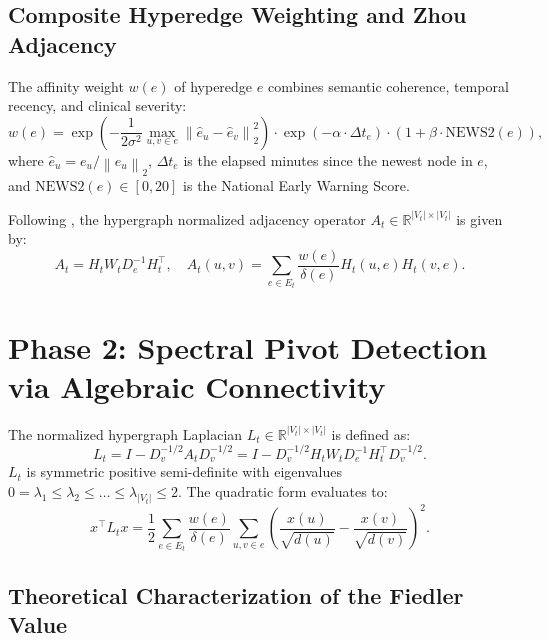 \documentclass[ijds,dblanonrev]{informs4}
\newcommand{\R}{\mathbb{R}}
\newcommand{\norm}[1]{\left\lVert#1\right\rVert}
\begin{document}
\subsection{Composite Hyperedge Weighting and Zhou Adjacency}
The affinity weight $w(e)$ of hyperedge $e$ combines semantic coherence, temporal recency, and clinical severity:
\begin{equation}
  w(e) = \exp\left( -\frac{1}{2\sigma^2} \max_{u, v \in e} \norm{\hat{e}_u - \hat{e}_v}_2^2 \right) \cdot \exp(-\alpha \cdot \Delta t_e) \cdot (1 + \beta \cdot \text{NEWS2}(e)),
  \label{eq:comp_weight}
\end{equation}
where $\hat{e}_u = e_u / \norm{e_u}_2$, $\Delta t_e$ is the elapsed minutes since the newest node in $e$, and $\text{NEWS2}(e) \in [0, 20]$ is the National Early Warning Score.

Following \cite{zhou2006learning}, the hypergraph normalized adjacency operator $A_t \in \R^{|V_t| \times |V_t|}$ is given by:
\begin{equation}
  A_t = H_t W_t D_e^{-1} H_t^\top, \quad A_t(u, v) = \sum_{e \in E_t} \frac{w(e)}{\delta(e)} H_t(u, e) H_t(v, e).
  \label{eq:adj_zhou}
\end{equation}

\section{Phase 2: Spectral Pivot Detection via Algebraic Connectivity}
\label{sec:phase2}

The normalized hypergraph Laplacian $L_t \in \R^{|V_t| \times |V_t|}$ is defined as:
\begin{equation}
  L_t = I - D_v^{-1/2} A_t D_v^{-1/2} = I - D_v^{-1/2} H_t W_t D_e^{-1} H_t^\top D_v^{-1/2}.
  \label{eq:norm_laplacian}
\end{equation}
$L_t$ is symmetric positive semi-definite with eigenvalues $0 = \lambda_1 \le \lambda_2 \le \dots \le \lambda_{|V_t|} \le 2$. The quadratic form evaluates to:
\begin{equation}
  x^\top L_t x = \frac{1}{2} \sum_{e \in E_t} \frac{w(e)}{\delta(e)} \sum_{u, v \in e} \left( \frac{x(u)}{\sqrt{d(u)}} - \frac{x(v)}{\sqrt{d(v)}} \right)^2.
  \label{eq:laplacian_quad}
\end{equation}

\subsection{Theoretical Characterization of the Fiedler Value}
\end{document}
